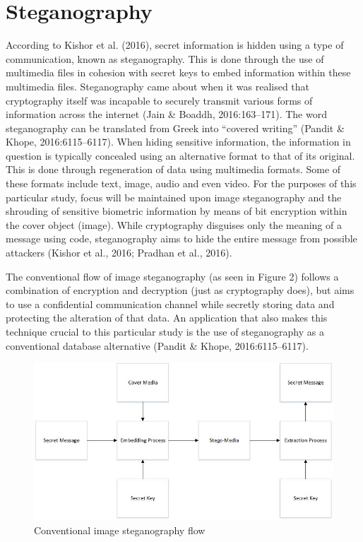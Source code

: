 \section[Steganography]{Steganography}
According to Kishor et al. (2016), secret information is hidden using a type of communication, known as steganography. This is done through the use of multimedia files in cohesion with secret keys to embed information within these multimedia files. Steganography came about when it was realised that cryptography itself was incapable to securely transmit various forms of information across the internet (Jain \& Boaddh, 2016:163–171). The word steganography can be translated from Greek into “covered writing” (Pandit \& Khope, 2016:6115–6117). When hiding sensitive information, the information in question is typically concealed using an alternative format to that of its original. This is done through regeneration of data using multimedia formats. Some of these formats include text, image, audio and even video. For the purposes of this particular study, focus will be maintained upon image steganography and the shrouding of sensitive biometric information by means of bit encryption within the cover object (image). While cryptography disguises only the meaning of a message using code, steganography aims to hide the entire message from possible attackers (Kishor et al., 2016; Pradhan et al., 2016).

The conventional flow of image steganography (as seen in Figure 2) follows a combination of encryption and decryption (just as cryptography does), but aims to use a confidential communication channel while secretly storing data and protecting the alteration of that data. An application that also makes this technique crucial to this particular study is the use of steganography as a conventional database alternative (Pandit \& Khope, 2016:6115–6117).


  
\begin{figure}[htbp!] 
\centering    
\includegraphics[width=1.0\textwidth]{Chapter2/Figs/Conventional_image_steganography_flow.jpg}
\caption[Conventional image steganography flow]{Conventional image steganography flow}
\label{fig:Conventional image steganography flow}
\end{figure}

